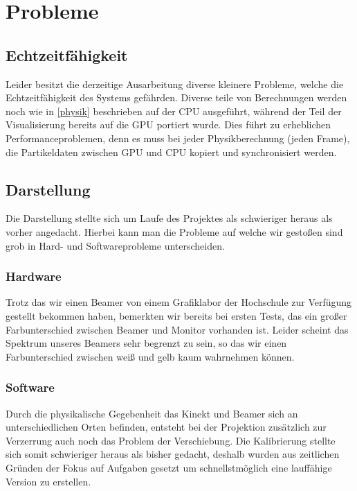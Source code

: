 \chapter{Probleme}
	\section{Echtzeitfähigkeit}
		Leider besitzt die derzeitige Ausarbeitung diverse kleinere Probleme, welche die Echtzeitfähigkeit des Systems gefährden.
		Diverse teile von Berechnungen werden noch wie in \ref{physik} beschrieben auf der CPU ausgeführt, während der Teil der Visualisierung bereits auf die GPU portiert wurde.
		Dies führt zu erheblichen Performanceproblemen, denn es muss bei jeder Physikberechnung (jeden Frame), die Partikeldaten zwischen GPU und CPU kopiert und synchronisiert werden.
	\section{Darstellung}
		Die Darstellung stellte sich um Laufe des Projektes als schwieriger heraus als vorher angedacht.
		Hierbei kann man die Probleme auf welche wir gestoßen sind grob in Hard- und Softwareprobleme unterscheiden.
		\subsection{Hardware}
			Trotz das wir einen Beamer von einem Grafiklabor der Hochschule zur Verfügung gestellt bekommen haben, bemerkten wir bereits bei ersten Tests, das ein großer Farbunterschied zwischen Beamer und
			Monitor vorhanden ist. Leider scheint das Spektrum unseres Beamers sehr begrenzt zu sein, so das wir einen Farbunterschied zwischen weiß und gelb kaum wahrnehmen können.		
		\subsection{Software}
			Durch die physikalische Gegebenheit das Kinekt und Beamer sich an unterschiedlichen Orten befinden, entsteht bei der Projektion zusätzlich zur Verzerrung auch noch das Problem der Verschiebung.
			Die Kalibrierung stellte sich somit schwieriger heraus als bisher gedacht, deshalb wurden aus zeitlichen Gründen der Fokus auf Aufgaben gesetzt um schnellstmöglich eine lauffähige Version zu erstellen.

